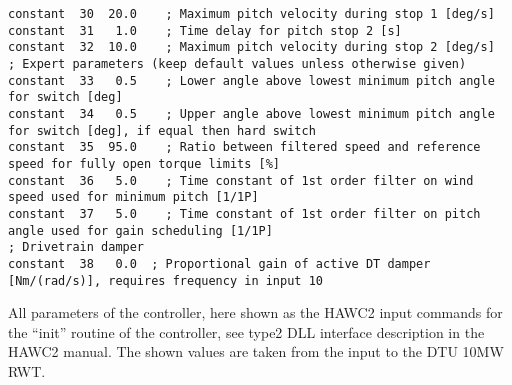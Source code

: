 \begin{table}[t!]
\begin{center}
\begin{verbatim}
constant  30  20.0    ; Maximum pitch velocity during stop 1 [deg/s]
constant  31   1.0    ; Time delay for pitch stop 2 [s]
constant  32  10.0    ; Maximum pitch velocity during stop 2 [deg/s]
; Expert parameters (keep default values unless otherwise given)
constant  33   0.5    ; Lower angle above lowest minimum pitch angle for switch [deg]
constant  34   0.5    ; Upper angle above lowest minimum pitch angle for switch [deg], if equal then hard switch
constant  35  95.0    ; Ratio between filtered speed and reference speed for fully open torque limits [%]
constant  36   5.0    ; Time constant of 1st order filter on wind speed used for minimum pitch [1/1P]
constant  37   5.0    ; Time constant of 1st order filter on pitch angle used for gain scheduling [1/1P]
; Drivetrain damper
constant  38   0.0  ; Proportional gain of active DT damper [Nm/(rad/s)], requires frequency in input 10
\end{verbatim}
\caption{All parameters of the controller, here shown as the HAWC2 input commands for the ``init'' routine of the controller, see type2 DLL interface description in the HAWC2 manual. The shown values are taken from the input to the DTU 10MW RWT. \label{t:init}}
\end{center}
\end{table}

